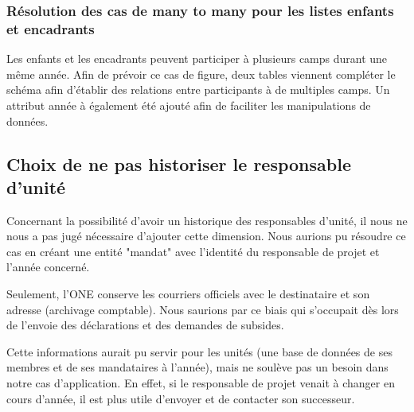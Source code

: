 \subsubsection{Résolution des cas de many to many pour les listes enfants et encadrants}
Les enfants et les encadrants peuvent participer à plusieurs camps durant une même année. Afin de prévoir ce cas de figure, deux tables viennent compléter le schéma afin d'établir des relations entre participants à de multiples camps. Un attribut année à également été ajouté afin de faciliter les manipulations de données.

\subsection{Choix de ne pas historiser le responsable d'unité}
Concernant la possibilité d'avoir un historique des responsables d'unité, il nous ne nous a pas jugé nécessaire d'ajouter cette dimension. Nous aurions pu résoudre ce cas en créant une entité "mandat" avec l'identité du responsable de projet et l'année concerné.

Seulement, l'ONE conserve les courriers officiels avec le destinataire et son adresse (archivage comptable). Nous saurions par ce biais qui s'occupait dès lors de l'envoie des déclarations et des demandes de subsides.

Cette informations aurait pu servir pour les unités (une base de données de ses membres et de ses mandataires à l'année), mais ne soulève pas un besoin dans notre cas d'application. En effet, si le responsable de projet venait à changer en cours d'année, il est plus utile d'envoyer et de contacter son successeur. 


